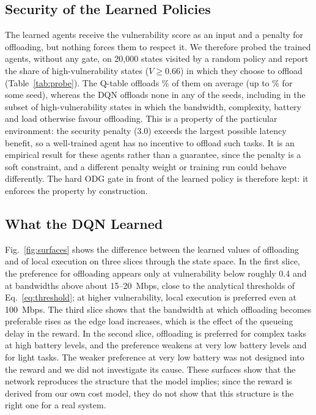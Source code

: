 \documentclass{ieeeaccess}
\begin{document}
\subsection{Security of the Learned Policies}
The learned agents receive the vulnerability score as an input and a penalty for offloading, but nothing forces them to respect it. We therefore probed the trained agents, without any gate, on 20{,}000 states visited by a random policy and report the share of high-vulnerability states ($V\ge0.66$) in which they choose to offload (Table~\ref{tab:probe}). The Q-table offloads \ProbeQHigh\% of them on average (up to \ProbeQHighMax\% for some seed), whereas the DQN offloads none in any of the \NSeeds{} seeds, including in the subset of high-vulnerability states in which the bandwidth, complexity, battery and load otherwise favour offloading. This is a property of the particular environment: the security penalty ($3.0$) exceeds the largest possible latency benefit, so a well-trained agent has no incentive to offload such tasks. It is an empirical result for these agents rather than a guarantee, since the penalty is a soft constraint, and a different penalty weight or training run could behave differently. The hard ODG gate in front of the learned policy is therefore kept: it enforces the property by construction.

\begin{table}[t]
\caption{Share of states in which the trained agents choose to offload without any gate, on 20{,}000 states visited by a random policy (mean over \NSeeds{} seeds; range over seeds in parentheses). High vulnerability means $V\ge0.66$; ``fav.'' (favourable) additionally requires bandwidth above about 16~Mbps, complexity above 0.5, battery above 0.2 and edge load below 0.5.}
\label{tab:probe}
\centering
\footnotesize

\end{table}

\subsection{What the DQN Learned}
Fig.~\ref{fig:surfaces} shows the difference between the learned values of offloading and of local execution on three slices through the state space. In the first slice, the preference for offloading appears only at vulnerability below roughly 0.4 and at bandwidths above about 15--20~Mbps, close to the analytical thresholds of Eq.~\eqref{eq:threshold}; at higher vulnerability, local execution is preferred even at 100~Mbps. The third slice shows that the bandwidth at which offloading becomes preferable rises as the edge load increases, which is the effect of the queueing delay in the reward. In the second slice, offloading is preferred for complex tasks at high battery levels, and the preference weakens at very low battery levels and for light tasks. The weaker preference at very low battery was not designed into the reward and we did not investigate its cause. These surfaces show that the network reproduces the structure that the model implies; since the reward is derived from our own cost model, they do not show that this structure is the right one for a real system.
\end{document}
